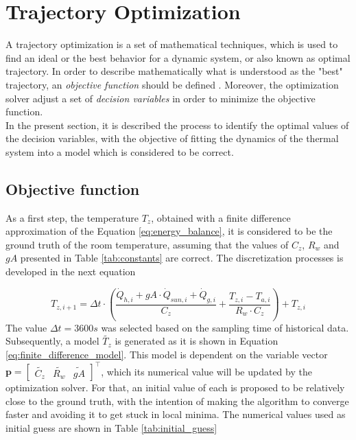 \section{Trajectory Optimization}
\label{sec:trajectory_optimization}

A trajectory optimization is a set of mathematical techniques, which is used to find an ideal or the best behavior for a dynamic system, or also known as optimal trajectory. In order to describe mathematically what is understood as the "best" trajectory, an \emph{objective function} should be defined \cite{kelly2017introduction}. Moreover, the optimization solver adjust a set of \emph{decision variables} in order to minimize the objective function.\\
In the present section, it is described the process to identify the optimal values of the decision variables, with the objective of fitting the dynamics of the thermal system into a model which is considered to be correct. 

\subsection{Objective function}
As a first step, the temperature $T_z$, obtained with a finite difference approximation of the Equation \ref{eq:energy_balance}, it is considered to be the ground truth of the room temperature, assuming that the values of $C_z$, $R_w$ and $gA$ presented in Table \ref{tab:constants} are correct. The discretization processes is developed in the next equation

\begin{equation}
T_{z,i+1} = \Delta t \cdot \left( \frac{\dot{Q}_{h,i} + gA \cdot \dot{Q}_{sun, i} + \dot{Q}_{g,i}}{C_z} + \frac{T_{z,i}-T_{a,i}}{R_w \cdot C_z} \right) + T_{z,i}
\label{eq:finite_difference_real}
\end{equation}
The value $\Delta t = 3600s$ was selected based on the sampling time of historical data.\\

Subsequently, a model $\tilde{T_z}$ is generated as it is shown in Equation \ref{eq:finite_difference_model}. This model is dependent on the variable vector $\mathbf{p} = \begin{bmatrix}
\tilde{C_z} & \tilde{R_w} & \tilde{gA} \end{bmatrix}^\top$, which its numerical value will be updated by the optimization solver. For that, an initial value of each is proposed to be relatively close to the ground truth, with the intention of making the algorithm to converge faster and avoiding it to get stuck in local minima. The numerical values used as initial guess are shown in Table \ref{tab:initial_guess}

